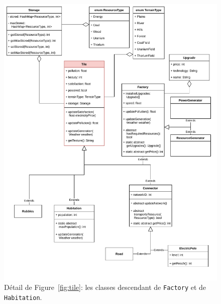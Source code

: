 \documentclass[12pt]{article}
\begin{document}
\begin{figure}[ht]
\includegraphics[width=\textwidth]{uml-classes-Page-3}
\caption{Détail de Figure~\ref{fig:tile}: les classes descendant de \texttt{Factory} et de \texttt{Habitation}.\label{fig:factory}}
\end{figure}
\end{document}
